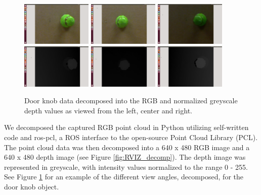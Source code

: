 \documentclass{article}
\begin{document}
\begin{figure}
    \centering
    \includegraphics[width=0.3\textwidth]{DH_RGB_L.png}
    \includegraphics[width=0.3\textwidth]{DH_RGB_C.png}
    \includegraphics[width=0.3\textwidth]{DH_RGB_R.png}
    \includegraphics[width=0.3\textwidth]{DH_D_L.png}
    \includegraphics[width=0.3\textwidth]{DH_D_C.png}
    \includegraphics[width=0.3\textwidth]{DH_D_R.png}
    \caption{Door knob data decomposed into the RGB and normalized greyscale depth values as viewed from the left, center and right.}
    \label{fig:decomposition}
    
\end{figure}
We decomposed the captured RGB point cloud in Python utilizing self-written code and ros-pcl, a ROS interface to the open-source Point Cloud Library (PCL)\cite{pcl, rospcl}. The point cloud data was then decomposed into a 640 x 480 RGB image and a 640 x 480 depth image (see Figure \ref{fig:RVIZ_decomp}). The depth image was represented in greyscale, with intensity values normalized to the range 0 - 255. See Figure \ref{fig:decomposition} for an example of the different view angles, decomposed, for the door knob object.
\end{document}
